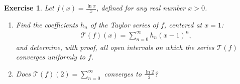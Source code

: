 \documentclass[11pt]{article}
\newtheorem{exercise}{Exercise}[section]
\theoremstyle{definition}
\numberwithin{equation}{subsection}
\begin{document}
\begin{exercise}{\rm *}
Let $f(x) = \frac{\ln x}{x}$, defined for any real number $x > 0$.
\begin{enumerate}[label=(\alph*)]
    \item Find the coefficients $h_n$ of the Taylor series of $f$, centered at $x = 1$:
    \begin{align*}
        \mathcal{T}(f)(x) = \sum^\infty_{n = 0} h_n (x - 1)^n,
    \end{align*}
    and determine, with proof, all open intervals on which the series $\mathcal{T}(f)$ converges uniformly to $f$.
    
    \item Does $\mathcal{T}(f)(2) = \sum^\infty_{n = 0}$ converges to $\frac{\ln 2}{2}$?
\end{enumerate}
\end{exercise}
\end{document}
